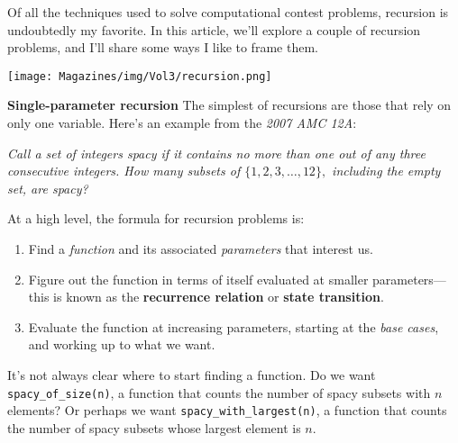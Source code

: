 \documentclass{article}
\begin{document}
\begin{multicols}{3}


Of all the techniques used to solve computational contest problems, recursion is undoubtedly my favorite. In this article, we'll explore a couple of recursion problems, and I'll share some ways I like to frame them.
\begin{center}
    \texttt{[image: Magazines/img/Vol3/recursion.png]}
\end{center}
\textbf{Single-parameter recursion}
The simplest of recursions are those that rely on only one variable. Here's an example from the \textit{2007 AMC 12A}:

\textit{Call a set of integers spacy if it contains no more than one out of any three consecutive integers. How many subsets of $\{1,2,3,\ldots,12\},$ including the empty set, are spacy?}

At a high level, the formula for recursion problems is:
\begin{enumerate}
\item Find a \textit{function} and its associated \textit{parameters} that interest us.
\item Figure out the function in terms of itself evaluated at smaller parameters—this is known as the \textbf{recurrence relation} or \textbf{state transition}.
\item Evaluate the function at increasing parameters, starting at the \textit{base cases}, and working up to what we want.
\end{enumerate}
It's not always clear where to start finding a function. Do we want \texttt{spacy\_of\_size(n)}, a function that counts the number of spacy subsets with $n$ elements? Or perhaps we want \texttt{spacy\_with\_largest(n)}, a function that counts the number of spacy subsets whose largest element is $n$.


\end{multicols}
\end{document}
